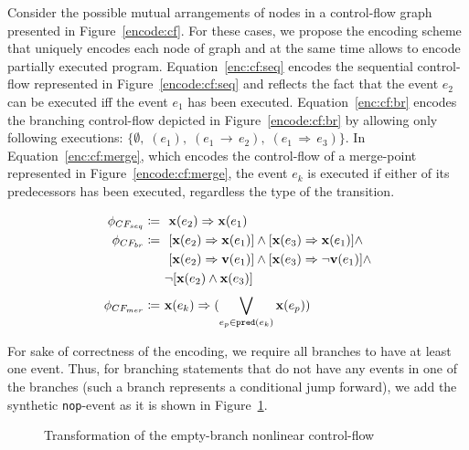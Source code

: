 Consider the possible mutual arrangements of nodes in a control-flow graph presented in Figure~\ref{encode:cf}.
For these cases, we propose the encoding scheme that uniquely encodes each node of graph and at the same time allows to encode partially executed program.
Equation~\ref{enc:cf:seq} encodes the sequential control-flow represented in Figure~\ref{encode:cf:seq} and reflects the fact that the event $e_2$ can be executed iff the event $e_1$ has been executed.
Equation~\ref{enc:cf:br} encodes the branching control-flow depicted in Figure~\ref{encode:cf:br} by allowing only following executions: $\{\emptyset, \; (e_1), \; (e_1\,\rightarrow\,e_2), \; (e_1\,\Rightarrow\,e_3)\}$.
In Equation~\ref{enc:cf:merge}, which encodes the control-flow of a merge-point represented in Figure~\ref{encode:cf:merge}, the event $e_k$ is executed if either of its predecessors has been executed, regardless the type of the transition.

\begin{align}
\phi_{CF_{seq}}   \coloneqq \ & \ \mathbf{x}(e_2) \Rightarrow \mathbf{x}(e_1) \label{enc:cf:seq} \\
\phi_{CF_{br}}    \coloneqq \ & \ [\mathbf{x}(e_2) \Rightarrow \mathbf{x}(e_1)] \land [\mathbf{x}(e_3) \Rightarrow \mathbf{x}(e_1)] \land \nonumber \\
                      & \ [\mathbf{x}(e_2) \Rightarrow \mathbf{v}(e_1)] \land [\mathbf{x}(e_3) \Rightarrow \lnot\mathbf{v}(e_1)] \land \nonumber \\
                      & \lnot [\mathbf{x}(e_2) \land \mathbf{x}(e_3)]  \label{enc:cf:br} \\
\phi_{CF_{mer}} \coloneqq \ & \mathbf{x}(e_k) \Rightarrow (\bigvee\limits_{e_p \in \texttt{pred}(e_k)}^{} \mathbf{x}(e_p)) \label{enc:cf:merge}
\end{align}


For sake of correctness of the encoding, we require all branches to have at least one event.
Thus, for branching statements that do not have any events in one of the branches (such a branch represents a conditional jump forward), we add the synthetic \texttt{nop}-event as it is shown in Figure~\ref{encode:branching:nop}.

\begin{figure}
    \centering
    \caption{Transformation of the empty-branch nonlinear control-flow}
    \label{encode:branching:nop}
\end{figure}


